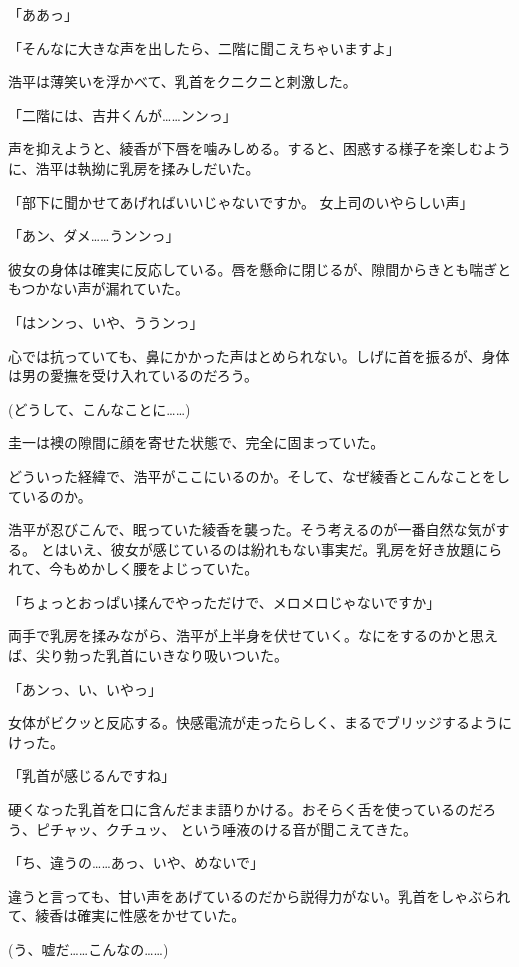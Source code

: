 ﻿\documentclass[
    book,tate,
    line_length=30zw,
    jafontsize=12pt,
    paper=b5j,
    landscape,
    ]{jlreq}
\begin{document}
「ああっ」

「そんなに大きな声を出したら、二階に聞こえちゃいますよ」

浩平は薄笑いを浮かべて、乳首をクニクニと刺激した。

「二階には、吉井くんが……ンンっ」

声を抑えようと、綾香が下唇を噛みしめる。すると、困惑する様子を楽しむように、浩平は執拗に乳房を揉みしだいた。

「部下に聞かせてあげればいいじゃないですか。 女上司のいやらしい声」

「あン、ダメ……うンンっ」

彼女の身体は確実に反応している。唇を懸命に閉じるが、隙間からきとも喘ぎともつかない声が漏れていた。

「はンンっ、いや、ううンっ」

心では抗っていても、鼻にかかった声はとめられない。しげに首を振るが、身体は男の愛撫を受け入れているのだろう。

(どうして、こんなことに……)

圭一は襖の隙間に顔を寄せた状態で、完全に固まっていた。

どういった経緯で、浩平がここにいるのか。そして、なぜ綾香とこんなことをしているのか。

浩平が忍びこんで、眠っていた綾香を襲った。そう考えるのが一番自然な気がする。
とはいえ、彼女が感じているのは紛れもない事実だ。乳房を好き放題にられて、今もめかしく腰をよじっていた。

「ちょっとおっぱい揉んでやっただけで、メロメロじゃないですか」

両手で乳房を揉みながら、浩平が上半身を伏せていく。なにをするのかと思えば、尖り勃った乳首にいきなり吸いついた。

「あンっ、い、いやっ」

女体がビクッと反応する。快感電流が走ったらしく、まるでブリッジするようにけった。

「乳首が感じるんですね」

硬くなった乳首を口に含んだまま語りかける。おそらく舌を使っているのだろう、ピチャッ、クチュッ、
という唾液のける音が聞こえてきた。

「ち、違うの……あっ、いや、めないで」

違うと言っても、甘い声をあげているのだから説得力がない。乳首をしゃぶられて、綾香は確実に性感をかせていた。

(う、嘘だ……こんなの……)
\end{document}
